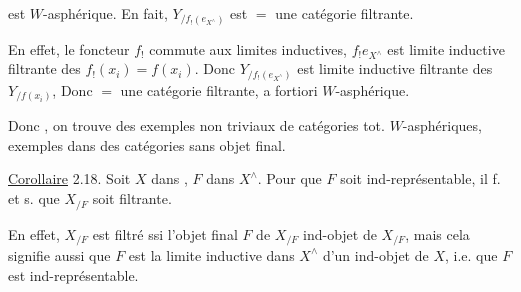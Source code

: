 
est $W$-asphérique. En fait, $Y_{/f_!(e_{X^\wedge})}$ est  $=$ une catégorie filtrante.

En effet, le foncteur $f_!$ commute aux limites inductives,  $f_!e_{X^\wedge}$ est limite inductive filtrante des $f_!(x_i)=f(x_i)$. Donc $Y_{/f_!(e_{X^\wedge})}$ est limite inductive filtrante des $Y_{/f(x_i)}$, Donc   $=$ une catégorie filtrante, a fortiori  $W$-asphérique.

Donc , on trouve des exemples non triviaux de catégories tot. $W$-asphériques,  exemples dans des catégories sans objet final.

\reversemarginpar{}\normalmarginpar

\uline{Corollaire} 2.18. Soit $X$ dans , $F$ dans $X^\wedge$. Pour que $F$ soit ind-représentable, il f. et s. que $X_{/F}$ soit filtrante.

En effet,  $X_{/F}$ est filtré ssi l'objet final $F$ de $X_{/F}$    ind-objet de $X_{/F}$, mais cela signifie aussi que $F$ est la limite inductive dans $X^\wedge$ d'un ind-objet de $X$, i.e. que $F$ est ind-représentable.

